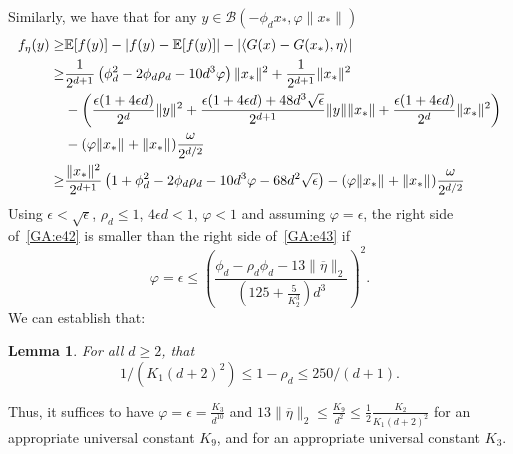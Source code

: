 \documentclass[11pt]{article}
\newtheorem{lemma}[theorem]{Lemma}
\newcommand{\red}[1]{{\color{red} #1}}
\newcommand{\xo}{x_\ast}
\newcommand{\etabar}{\overline{\eta}}
\newcommand{\Tnorm}{}
\newcommand\norm[2][\Tnorm]{\ensuremath{{\left\|#2\right\|}_{#1}}}
\newcommand\Tinnerprod{}
\newcommand{\innerprod}[3][\Tinnerprod]{\ifthenelse{\equal{#1}{}}{\ensuremath{\left<#2,#3\right>}}{\ensuremath{\left<#2,#3\right>_{#1}}}}
\begin{document}
Similarly, we have that for any $y \in \mathcal{B}(- \phi_d x_*, \varphi  \|x_*\|)$
\begin{align}
f_\eta(y) \geq& \mathbb{E}[f(y)] - |f(y) - \mathbb{E}[f(y)]|
-
\left|\innerprod{G(x) - G(x_\ast)}{\eta}\right|
  \nonumber \\
\geq& \frac{1}{2^{d+1}} \left(\phi_d^2 - 2 \phi_d \rho_d - 10 d^3 \varphi \right) \|x_*\|^2 + \frac{1}{2^{d+1}} \|x_*\|^2 \nonumber \\
&- \left( \frac{\epsilon (1 + 4 \epsilon d)}{2^d} \|y\|^2 + \frac{\epsilon(1 + 4 \epsilon d) + 48 d^3 \sqrt{\epsilon}}{2^{d+1}} \|y\| \|x_*\| + \frac{\epsilon (1 + 4 \epsilon d)}{2^d} \|x_*\|^2 \right) \nonumber \\
&- (\varphi \norm{\xo} + \norm{\xo}) \frac{\omega}{2^{d/2}} \nonumber \\
\geq&
\frac{\|x_*\|^2}{2^{d+1}} \left(1 + \phi_d^2 - 2 \phi_d \rho_d - 10 d^3 \varphi
- 68 d^2 \sqrt{\epsilon}
\right) -(\varphi \norm{\xo} + \norm{\xo}) \frac{\omega}{2^{d/2}}
\label{GA:e43}
\end{align}
Using $\epsilon < \sqrt{\epsilon}$, $\rho_d \leq 1$, $4 \epsilon d < 1$, $\varphi < 1$ and assuming $\varphi = \epsilon$, the right side of~\eqref{GA:e42} is smaller than the right side of~\eqref{GA:e43} if
\begin{equation} \label{GA:e44}
\varphi = \epsilon \leq \left(\frac{\phi_d - \rho_d \phi_d  - 13 \|\etabar\|_2}{\left( 125 + \frac{5}{K_2^3} \right) d^3} \right)^2.
\end{equation}
We can establish that:
\begin{lemma}\label{lemma:rho-d}
For all $d\geq 2$, that
\[
1/\left(K_1(d + 2)^2\right) \leq 1 - \rho_d \leq 250/(d + 1).
\]
\end{lemma}
Thus, it suffices to have $\varphi = \epsilon = \frac{K_3}{d^{10}}$ and $13 \|\etabar\|_2 \leq \frac{K_9}{d^2} \leq \frac{1}{2} \frac{K_2}{K_1 (d+2)^2}$ for an appropriate universal constant $K_9$, and for an appropriate universal constant $K_3$.  %
\end{document}
